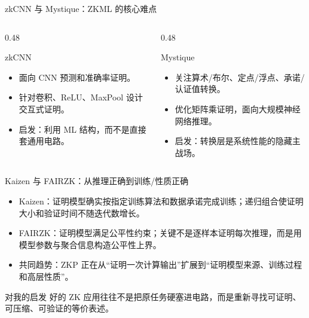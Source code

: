 \documentclass[aspectratio=169]{beamer}
\newcommand{\kw}[1]{\textcolor{uestc}{\heiti #1}}
\begin{document}
\begin{frame}{zkCNN 与 Mystique：ZKML 的核心难点}
  \begin{columns}[T,onlytextwidth]
    \begin{column}{0.48\textwidth}
      \begin{block}{zkCNN}
        \begin{itemize}
          \item 面向 CNN 预测和准确率证明。
          \item 针对卷积、ReLU、MaxPool 设计交互式证明。
          \item 启发：利用 ML 结构，而不是直接套通用电路。
        \end{itemize}
      \end{block}
    \end{column}
    \begin{column}{0.48\textwidth}
      \begin{block}{Mystique}
        \begin{itemize}
          \item 关注算术/布尔、定点/浮点、承诺/认证值转换。
          \item 优化矩阵乘证明，面向大规模神经网络推理。
          \item 启发：转换层是系统性能的隐藏主战场。
        \end{itemize}
      \end{block}
    \end{column}
  \end{columns}
\end{frame}

\begin{frame}{Kaizen 与 FAIRZK：从推理正确到训练/性质正确}
  \begin{itemize}
    \item \kw{Kaizen}：证明模型确实按指定训练算法和数据承诺完成训练；递归组合使证明大小和验证时间不随迭代数增长。
    \item \kw{FAIRZK}：证明模型满足公平性约束；关键不是逐样本证明每次推理，而是用模型参数与聚合信息构造公平性上界。
    \item 共同趋势：ZKP 正在从“证明一次计算输出”扩展到“证明模型来源、训练过程和高层性质”。
  \end{itemize}
  \begin{block}{对我的启发}
    好的 ZK 应用往往不是把原任务硬塞进电路，而是重新寻找可证明、可压缩、可验证的等价表述。
  \end{block}
\end{frame}
\end{document}
